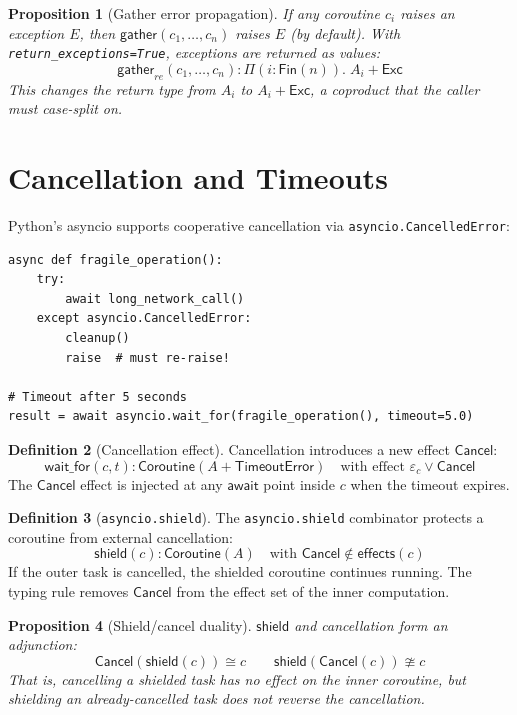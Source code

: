 \documentclass[11pt,a4paper]{report}
\theoremstyle{definition}
\newtheorem{definition}{Definition}[chapter]
\theoremstyle{plain}
\newtheorem{proposition}[definition]{Proposition}
\begin{document}
\begin{proposition}[Gather error propagation]
If any coroutine $c_i$ raises an exception $E$, then
$\mathsf{gather}(c_1, \ldots, c_n)$ raises $E$ (by default).  With
\lstinline[style=python]{return_exceptions=True}, exceptions are returned
as values:
\[
  \mathsf{gather}_{\mathit{re}}(c_1, \ldots, c_n) :
    \Pi(i : \mathsf{Fin}(n)).\; A_i + \mathsf{Exc}
\]
This changes the return type from $A_i$ to $A_i + \mathsf{Exc}$, a
coproduct that the caller must case-split on.
\end{proposition}

\section{Cancellation and Timeouts}

Python's asyncio supports cooperative cancellation via
\lstinline[style=python]{asyncio.CancelledError}:

\begin{lstlisting}[style=python]
async def fragile_operation():
    try:
        await long_network_call()
    except asyncio.CancelledError:
        cleanup()
        raise  # must re-raise!

# Timeout after 5 seconds
result = await asyncio.wait_for(fragile_operation(), timeout=5.0)
\end{lstlisting}

\begin{definition}[Cancellation effect]
Cancellation introduces a new effect $\mathsf{Cancel}$:
\[
  \mathsf{wait\_for}(c, t) : \mathsf{Coroutine}(A + \mathsf{TimeoutError})
    \quad \text{with effect } \varepsilon_c \vee \mathsf{Cancel}
\]
The $\mathsf{Cancel}$ effect is injected at any $\mathsf{await}$ point
inside $c$ when the timeout expires.
\end{definition}

\begin{definition}[\texttt{asyncio.shield}]
The \lstinline[style=python]{asyncio.shield} combinator protects a
coroutine from external cancellation:
\[
  \mathsf{shield}(c) : \mathsf{Coroutine}(A) \quad
    \text{with } \mathsf{Cancel} \not\in \mathsf{effects}(c)
\]
If the outer task is cancelled, the shielded coroutine continues running.
The typing rule removes $\mathsf{Cancel}$ from the effect set of the
inner computation.
\end{definition}

\begin{proposition}[Shield/cancel duality]
$\mathsf{shield}$ and cancellation form an adjunction:
\[
  \mathsf{Cancel}(\mathsf{shield}(c)) \cong c \qquad
  \mathsf{shield}(\mathsf{Cancel}(c)) \ncong c
\]
That is, cancelling a shielded task has no effect on the inner coroutine,
but shielding an already-cancelled task does not reverse the cancellation.
\end{proposition}
\end{document}
